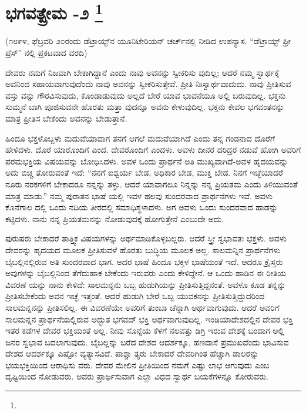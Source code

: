 
\chapter[ಭಗವತ್ಪ್ರೇಮ -೨ ]{ಭಗವತ್ಪ್ರೇಮ -೨ \protect\footnote{}}

\centerline{(೧೮೯೪, ಫೆಬ್ರವರಿ ೨೦ರಂದು ಡೆಟ್ರಾಯ್ಟ್​ನ ಯೂನಿಟೇರಿಯನ್​ ಚರ್ಚ್​ನಲ್ಲಿ ನೀಡಿದ ಉಪನ್ಯಾಸ. “ಡೆಟ್ರಾಯ್ಟ್​ ಫ್ರೀ ಪ್ರೆಸ್​” ನಲ್ಲಿ ಪ್ರಕಟವಾದ ವರದಿ)}

ದೇವರು ನಮಗೆ ನಿಜವಾಗಿ ಬೇಕಾಗಿದ್ದಾನೆ ಎಂದು ನಾವು ಅವನನ್ನು ಸ್ವೀಕರಿಸು ವುದಿಲ್ಲ; ಆದರೆ ನಮ್ಮ ಸ್ವಾರ್ಥಕ್ಕೆ ಅವನಿಂದ ಸಹಾಯವಾಗುವುದೆಂದು ನಾವು ಅವನನ್ನು ಸ್ವೀಕರಿಸುತ್ತೇವೆ. ಪ್ರೀತಿ ನಿಃಸ್ವಾರ್ಥವಾದುದು. ನಾವು ಪ್ರೀತಿಸುವ ವಸ್ತು ವನ್ನು ಗೌರವಿಸುವುದು, ಕೊಂಡಾಡುವುದು ಅಲ್ಲದೆ ಬೇರೆ ಯಾವ ಭಾವನೆಯೂ ಅಲ್ಲಿ ಬರುವುದಿಲ್ಲ. ಭಕ್ತನು ಸುಮ್ಮನೆ ಬಾಗಿ ಪೂಜಿಸುವನೇ ಹೊರತು ಮತ್ತಾ ವುದನ್ನೂ ಅವನು ಕೇಳುವುದಿಲ್ಲ. ಭಕ್ತನು ಕೇವಲ ಭಗವಂತನನ್ನು ಮಾತ್ರ ಪ್ರೀತಿಸ ಬೇಕೆಂದು ಅವನನ್ನು ಬೇಡುತ್ತಾನೆ.

ಹಿಂದೂ ಭಕ್ತಳೊಬ್ಬಳು ಮದುವೆಯಾದಾಗ ತನಗೆ ಆಗಲೆ ಮದುವೆಯಾಗಿದೆ ಎಂದು ತನ್ನ ಗಂಡನಾದ ದೊರೆಗೆ ಹೇಳಿದಳು. ದೊರೆ ಯಾರೊಂದಿಗೆ ಎಂದ. ದೇವರೊಂದಿಗೆ ಎಂದಳು. ಅವಳು ದೀನರ ದರಿದ್ರರ ನಡುವೆ ಹೋಗಿ ಅವರಿಗೆ ಪರಮಭಕ್ತಿಯ ವಿಷಯವನ್ನು ಬೋಧಿಸಿದಳು. ಅವಳ ಒಂದು ಪ್ರಾರ್ಥನೆ ಅತಿ ಮುಖ್ಯವಾಗಿದೆ-ಅವಳ ಹೃದಯವನ್ನು ಅದು ಬಿಚ್ಚಿ ತೋರುವಂತೆ ಇದೆ: “ನನಗೆ ಐಶ್ವರ್ಯ ಬೇಡ, ಅಧಿಕಾರ ಬೇಡ, ಮುಕ್ತಿ ಬೇಡ. ನಿನಗೆ ಇಚ್ಛೆಯಾದರೆ ನೂರು ನರಕಗಳಿಗೆ ಬೇಕಾದರೂ ನನ್ನನ್ನು ತಳ್ಳು. ಆದರೆ ಯಾವಾಗಲೂ ನಿನ್ನನ್ನು ನನ್ನ ಪ್ರಿಯತಮ ಎಂದು ತಿಳಿಯುವಂತೆ ಮಾತ್ರ ಮಾಡು.” ನಮ್ಮ ಪುರಾತನ ಭಾಷೆ ಯಲ್ಲಿ ಇವಳ ಹಲವು ಸುಂದರವಾದ ಪ್ರಾರ್ಥನೆಗಳು ಇವೆ. ಅವಳು ಕೊನೆಗಾಲ ದಲ್ಲಿ ಒಂದು ನದಿಯ ತೀರದಲ್ಲಿ ಸಮಾಧಿಸ್ಥಳಾದಳು. ಅಗ ಅವಳು ಒಂದು ಸುಂದರವಾದ ಹಾಡನ್ನು ಕಟ್ಟಿದಳು. ನಾನು ನನ್ನ ಪ್ರಿಯತಮನನ್ನು ನೋಡುವುದಕ್ಕೆ ಹೋಗುತ್ತೇನೆ ಎಂಬುದೇ ಅದು.

ಪುರುಷರು ಬೇಕಾದರೆ ತಾತ್ತ್ವಿಕ ವಿಷಯಗಳನ್ನು ಅರ್ಥಮಾಡಿಕೊಳ್ಳಬಲ್ಲರು. ಆದರೆ ಸ್ತ್ರೀ ಸ್ವಭಾವತಃ ಭಕ್ತಳು. ಅವಳು ದೇವರನ್ನು ಹೃದಯದ ಮೂಲಕ ಪ್ರೀತಿಸುವಳೆ ಹೊರತು ಬುದ್ಧಿಯ ಮೂಲಕ ಅಲ್ಲ. ಸಾಲಮನ್ನಿನ ಪ್ರಾರ್ಥನೆಗಳು ಬೈಬಲ್ಲಿನಲ್ಲಿರುವ ಅತಿ ಸುಂದರವಾದ ಭಾಗ. ಅದರ ಭಾಷೆ ಹಿಂದೂ ಭಕ್ತಳ ಭಾಷೆಯಂತೆ ಇದೆ. ಆದರೂ ಕ್ರೈಸ್ತರು ಅವುಗಳನ್ನು ಬೈಬಲ್ಲಿನಿಂದ ತೆಗೆದುಹಾಕ ಬೇಕೆಂದು ಇರುವರು ಎಂದು ಕೇಳಿದ್ದೇನೆ. ಆ ಒಂದು ಹಾಡಿನ ಈ ರೀತಿಯ ವಿವರಣೆ ಯನ್ನು ನಾನು ಕೇಳಿದೆ: ಸಾಲಮನ್ನನು ಒಬ್ಬ ಹುಡುಗಿಯನ್ನು ಪ್ರೀತಿಸುತ್ತಿದ್ದನಂತೆ. ಅವಳೂ ಕೂಡ ತನ್ನನ್ನು ಪ್ರೀತಿಸಬೇಕೆಂದು ಅವನ ಇಚ್ಛೆ ಇತ್ತಂತೆ. ಆದರೆ ಹುಡುಗಿ ಬೇರೆ ಒಬ್ಬ ಯುವಕನನ್ನು ಪ್ರೀತಿಸುತ್ತಿದ್ದುದರಿಂದ ಸಾಲಮನ್ನನನ್ನು ಪ್ರೀತಿಸಲಿಲ್ಲ. ಈ ವಿವರಣೆಯೇ ಅವರಿಗೆ ತುಂಬಾ ಚೆನ್ನಾಗಿ ಅರ್ಥವಾಗುವುದು. ಆದರೆ ಅವರಿಗೆ ಸಾಲಮನ್ನನ ಪ್ರಾರ್ಥನೆಯಲ್ಲಿರುವ ಅದ್ಭುತ ಭಗವದ್​ ಭಕ್ತಿ ಅರ್ಥವಾಗುವುದಿಲ್ಲ. ಇಂಡಿಯಾದೇಶದಲ್ಲಿನ ದೇವರ ಭಕ್ತಿ ಇತರ ಕಡೆಗಳ ದೇವರ ಭಕ್ತಿಯಂತೆ ಅಲ್ಲ. ನೀವು ಸೊನ್ನೆಯ ಕೆಳಗೆ ನಲವತ್ತು ಡಿಗ್ರಿ ಇರುವ ದೇಶಕ್ಕೆ ಬಂದಾಗ ಅಲ್ಲಿ ಜನರ ಸ್ವಭಾವ ಬದಲಾಗುವುದು. ಬೈಬಲ್ಲನ್ನು ಬರೆದ ದೇಶದ ಆದರ್ಶಕ್ಕೂ, ಹಣದಾಸೆ ಪ್ರಮುಖವೆಂದು ಭಾವಿಸುವ ದೇಶದ ಆದರ್ಶಕ್ಕೂ ಎಷ್ಟೋ ವ್ಯತ್ಯಾಸವಿದೆ. ಪಾಶ್ಚಾ ತ್ಯರು ಬೇಕಾದರೆ ದೇವರಿಗಿಂತ ಹೆಚ್ಚಾಗಿ ಡಾಲರನ್ನು ಭಯಭಕ್ತಿಯಿಂದ ಆರಾಧಿಸು ವರು. ದೇವರ ಮೇಲಿನ ಪ್ರೀತಿಯಿಂದ ನಮಗೆ ಎಷ್ಟು ಲಾಭ ಆಗುವುದು ಎಂಬ ದೃಷ್ಟಿಯಿಂದ ನೋಡುವರು. ಅವರು ಪ್ರಾರ್ಥಿಸುವಾಗ ಎಲ್ಲಾ ವಿಧದ ಸ್ವಾರ್ಥ ಬಯಕೆಗಳನ್ನೂ ಕೋರುವರು.

